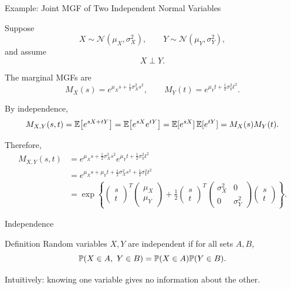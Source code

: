 \begin{frame}{Example: Joint MGF of Two Independent Normal Variables}

Suppose
$$
X\sim\mathcal N(\mu_X,\sigma_X^2),
\qquad
Y\sim\mathcal N(\mu_Y,\sigma_Y^2),
$$
and assume
$$
X\perp Y.
$$

The marginal MGFs are
$$
M_X(s)
=
e^{\mu_Xs+\frac12\sigma_X^2s^2},
\qquad
M_Y(t)
=
e^{\mu_Yt+\frac12\sigma_Y^2t^2}.
$$

By independence,
$$
M_{X,Y}(s,t)
=
\mathbb{E}\!\left[e^{sX+tY}\right]
=
\mathbb{E}\!\left[e^{sX}e^{tY}\right]
=
\mathbb{E}[e^{sX}]\,\mathbb{E}[e^{tY}]
=
M_X(s)M_Y(t).
$$

Therefore,
$$
\begin{aligned}
M_{X,Y}(s,t)
&=
e^{\mu_Xs+\frac12\sigma_X^2s^2}
e^{\mu_Yt+\frac12\sigma_Y^2t^2}
\\[1mm]
&=
e^{
\mu_Xs+\mu_Yt
+\frac12\sigma_X^2s^2
+\frac12\sigma_Y^2t^2
}
\\[1mm]
&=
\exp\left\{
\begin{pmatrix}
s\\
t
\end{pmatrix}^{\!T}
\begin{pmatrix}
\mu_X\\
\mu_Y
\end{pmatrix}
+
\frac12
\begin{pmatrix}
s\\
t
\end{pmatrix}^{\!T}
\begin{pmatrix}
\sigma_X^2 & 0\\
0 & \sigma_Y^2
\end{pmatrix}
\begin{pmatrix}
s\\
t
\end{pmatrix}
\right\}.
\end{aligned}
$$

\end{frame}















\begin{frame}{Independence}
\begin{keybox}{Definition}
Random variables \(X,Y\) are independent if for all sets \(A,B\),
\[
\mathbb{P}(X\in A,\ Y\in B)
=
\mathbb{P}(X\in A)\mathbb{P}(Y\in B).
\]
\end{keybox}

\vspace{0.25cm}

Intuitively:
knowing one variable gives no information about the other.
\end{frame}






















